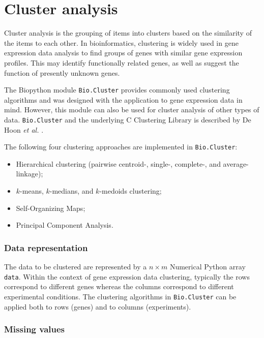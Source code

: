 \documentclass{report}
\begin{document}


\chapter{Cluster analysis}

Cluster analysis is the grouping of items into clusters based on the similarity of the items to each other. In bioinformatics, clustering is widely used in gene expression data analysis to find groups of genes with similar gene expression profiles. This may identify functionally related genes, as well as suggest the function of presently unknown genes.

The Biopython module \verb|Bio.Cluster| provides commonly used clustering algorithms and was designed with the application to gene expression data in mind. However, this module can also be used for cluster analysis of other types of data. \verb|Bio.Cluster| and the underlying C Clustering Library is described by De Hoon \textit{et al.} \cite{dehoon2004}.

The following four clustering approaches are implemented in \verb|Bio.Cluster|:
\begin{itemize}
\item
Hierarchical clustering (pairwise centroid-, single-, complete-, and average-linkage);
\item
$k$-means, $k$-medians, and $k$-medoids clustering;
\item
Self-Organizing Maps;
\item
Principal Component Analysis.
\end{itemize}

\subsection*{Data representation}

The data to be clustered are represented by a $n \times m$ Numerical Python array \verb|data|. Within the context of gene expression data clustering, typically the rows correspond to different genes whereas the columns correspond to different experimental conditions. The clustering algorithms in \verb|Bio.Cluster| can be applied both to rows (genes) and to columns (experiments).

\subsection*{Missing values}
\end{document}
